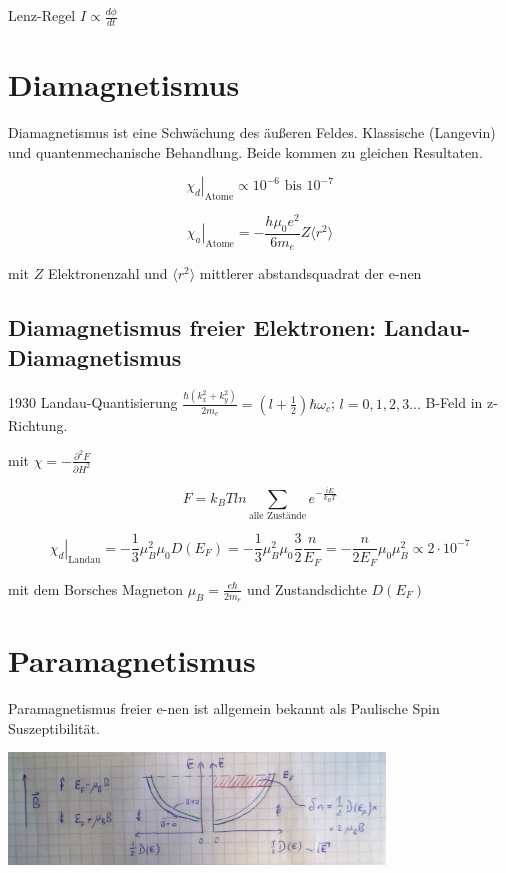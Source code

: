 Lenz-Regel \(I \propto \frac{d\phi}{dt}\)

\section{Diamagnetismus}

Diamagnetismus ist eine Schwächung des äußeren Feldes. Klassische (Langevin) und quantenmechanische Behandlung. Beide kommen zu gleichen Resultaten. 




\[\left.\chi_d\right|_{\text{Atome}}\propto 10^{-6}\text{ bis }10^{-7}\]

\[\left.\chi_a\right|_{\text{Atome}} = -\frac{h\mu_0 e^2}{6m_e}Z \langle r^2\rangle \]

mit \(Z\) Elektronenzahl und \(\langle r^2\rangle  \) mittlerer abstandsquadrat der e-nen

\subsection{Diamagnetismus freier Elektronen: Landau-Diamagnetismus}

1930 Landau-Quantisierung \(\frac{\hbar(k^2_x+k^2_y)}{2m_e} = (l+\frac{1}{2})\hbar\omega_c\); \(l=0,1,2,3...\) B-Feld in z-Richtung.

mit \(\chi = -\frac{\partial^2 F}{\partial H^2}\)

\[F = k_B T ln\sum_{\text{alle Zustände}}e^{-\frac{iE}{k_B T}}\]

\[\left.\chi_d\right|_{\text{Landau}}= -\frac{1}{3}\mu_B^2\mu_0 D(E_F) =-\frac{1}{3}\mu_B^2\mu_0 \frac{3}{2}\frac{n}{E_F} = -\frac{n}{2E_F}\mu_0\mu_B^2 \propto 2\cdot 10^{-7} \]

mit dem Borsches Magneton \( \mu_B=\frac{e\hbar}{2m_e} \) und Zustandsdichte \(D(E_F) \)


\section{Paramagnetismus}

Paramagnetismus freier e-nen ist allgemein bekannt als Paulische Spin Suszeptibilität.

\includegraphics[width=0.75\textwidth]{kap12_04.png}

